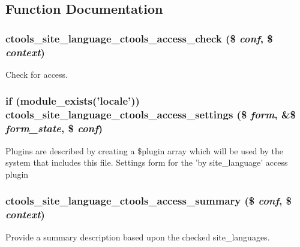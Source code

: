 \subsection{Function Documentation}
\hypertarget{site__language_8inc_a91aa2e05cdc4966cd4827cb58416dba5}{
\subsubsection[{ctools\_\-site\_\-language\_\-ctools\_\-access\_\-check}]{\setlength{\rightskip}{0pt plus 5cm}ctools\_\-site\_\-language\_\-ctools\_\-access\_\-check (\$ {\em conf}, \/  \$ {\em context})}}
\label{site__language_8inc_a91aa2e05cdc4966cd4827cb58416dba5}
Check for access. \hypertarget{site__language_8inc_a4d93db692f7fd1be9ea8ca09b925a773}{
\subsubsection[{ctools\_\-site\_\-language\_\-ctools\_\-access\_\-settings}]{\setlength{\rightskip}{0pt plus 5cm}if (module\_\-exists('locale')) ctools\_\-site\_\-language\_\-ctools\_\-access\_\-settings (\$ {\em form}, \/  \&\$ {\em form\_\-state}, \/  \$ {\em conf})}}
\label{site__language_8inc_a4d93db692f7fd1be9ea8ca09b925a773}
Plugins are described by creating a \$plugin array which will be used by the system that includes this file. Settings form for the 'by site\_\-language' access plugin \hypertarget{site__language_8inc_af4c58c89029a4c6801d2253815fd419e}{
\subsubsection[{ctools\_\-site\_\-language\_\-ctools\_\-access\_\-summary}]{\setlength{\rightskip}{0pt plus 5cm}ctools\_\-site\_\-language\_\-ctools\_\-access\_\-summary (\$ {\em conf}, \/  \$ {\em context})}}
\label{site__language_8inc_af4c58c89029a4c6801d2253815fd419e}
Provide a summary description based upon the checked site\_\-languages. 